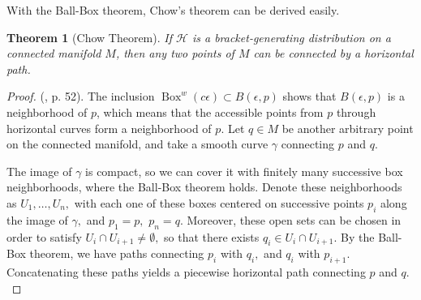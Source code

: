 \documentclass[12pt, letterpaper, reqno]{amsart}
\theoremstyle{definition}
\theoremstyle{plain}
\newtheorem{thm}{Theorem}
\theoremstyle{remark}
\begin{document}
With the Ball-Box theorem, Chow's theorem can be derived easily.

\begin{thm}[Chow Theorem]
	If $ \mathcal{H} $ is a bracket-generating distribution on a connected manifold $ M $, then any two points of $ M $ can be connected by a horizontal path.
\end{thm}
\begin{proof} (\cite{montgomery2002tour}, p. 52). The inclusion $ \operatorname{Box}^w(c\epsilon) \subset B(\epsilon,p)$ shows that $ B(\epsilon, p) $ is a neighborhood of $ p $, which means that the accessible points from $ p $ through horizontal curves form a neighborhood of $ p. $ Let $ q\in M $ be another arbitrary point on the connected manifold, and take a smooth curve $ \gamma $ connecting $ p $ and $ q. $  

	The image of $ \gamma $ is compact, so we can cover it with finitely many successive box neighborhoods, where the Ball-Box theorem holds. Denote these neighborhoods as $ U_1,\dots,U_n, $ with each one of these boxes centered on successive points $ p_i $ along the image of $ \gamma, $ and $ p_1=p, $ $ p_n=q. $ Moreover, these open sets can be chosen in order to satisfy $ U_i\cap U_{i+1}\neq\emptyset, $ so that there exists $ q_i \in U_i\cap U_{i+1}. $ By the Ball-Box theorem, we have paths connecting $ p_i $ with $ q_i, $ and $ q_i $ with $ p_{i+1}. $ Concatenating these paths yields a piecewise horizontal path connecting $ p $ and $ q. $ 
	
\end{proof}
\end{document}
